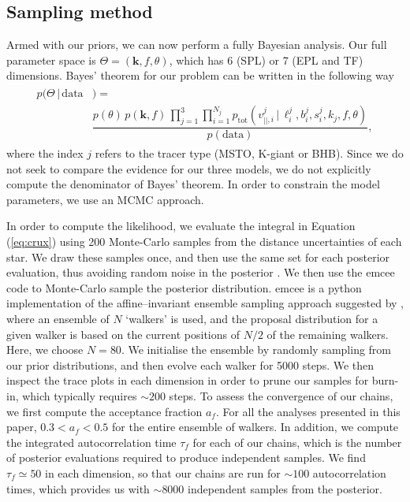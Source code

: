 \documentclass[useAMS,twocolumn,usenatbib]{mn2e}
\begin{document}
\subsection{Sampling method}
\label{sec:sampling_method}

Armed with our priors, we can now perform a fully Bayesian analysis. 
Our full parameter space is $\Theta =(\boldsymbol{k},f,\theta)$, which has 6 (SPL) or 7 (EPL and TF) dimensions. 
Bayes' theorem for our problem can be written in the following way
%
\begin{gather}
\begin{align}
p(\Theta \,| \,\mathrm{data}{}&) =  \nonumber \\
                    {}& \dfrac{p(\theta)\,p(\boldsymbol{k},f)\,\prod\limits_{j=1}^3
                    \prod\limits_{i=1}^{N_j}p_\mathrm{tot}(v_{||,i}^j \,|\, \ell_i^j,b_i^j,s_i^j,k_j,f,\theta)}{p(\mathrm{data})},
\end{align}
\label{eq:bayes}
\end{gather}
%
where the index $j$ refers to the tracer type (MSTO, K-giant or BHB). 
Since we do not seek to compare the evidence for our three models, we do not explicitly compute the denominator of Bayes' theorem. 
In order to constrain the model parameters, we use an MCMC approach.

In order to compute the likelihood, we evaluate the integral in Equation (\ref{eq:crux}) using 200 Monte-Carlo samples from the distance uncertainties of each star. 
We draw these samples once, and then use the same set for each posterior evaluation, thus avoiding random noise in the posterior \citep{Mc13}.
We then use the {\sc emcee} code \citep{emcee} to Monte-Carlo sample the posterior distribution. 
{\sc emcee} is a {\sc python} implementation of the affine--invariant ensemble sampling approach suggested by \citet{Go10}, where an ensemble of $N$ `walkers' is used, and the proposal distribution for a given walker is based on the current positions of $N/2$ of the remaining walkers. 
Here, we choose $N=80$.
We initialise the ensemble by randomly sampling from our prior distributions, and then evolve each walker for 5000 steps. 
We then inspect the trace plots in each dimension in order to prune our samples for burn-in, which typically requires $\sim 200$ steps. 
To assess the convergence of our chains, we first compute the acceptance fraction $a_f$.
For all the analyses presented in this paper, $0.3 < a_f < 0.5$ for the entire ensemble of walkers.
In addition, we compute the integrated autocorrelation time $\tau_f$ for each of our chains, which is the number of posterior evaluations required to produce independent samples.
We find $\tau_f \simeq 50$ in each dimension, so that our chains are run for $\sim 100$ autocorrelation times, which provides us with $\sim 8000$ independent samples from the posterior.
\end{document}
